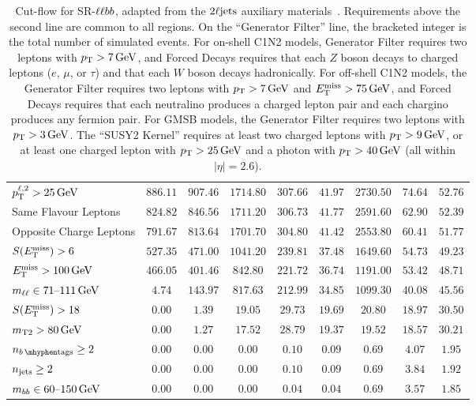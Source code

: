 \begin{sidewaystable}[tp]
{\begin{tabular}{lcccccccc}
$\pt^{\ell,2} > 25\,\eV[G]$                         & $886.11$ & $907.46$ & $1714.80$ & $307.66$ & $41.97$ & $2730.50$ & $74.64$ & $52.76$ \\
Same Flavour Leptons                                       & $824.82$ & $846.56$ & $1711.20$ & $306.73$ & $41.77$ & $2591.60$ & $62.90$ & $52.39$ \\
Opposite Charge Leptons                                   & $791.67$ & $813.64$ & $1701.70$ & $304.80$ & $41.42$ & $2553.80$ & $60.41$ & $51.77$ \\
$\metsig > 6$                                               & $527.35$ & $471.00$ & $1041.20$ & $239.81$ & $37.48$ & $1649.60$ & $54.73$ & $49.23$ \\
$\met > 100\,\eV[G]$                                           & $466.05$ & $401.46$ & $842.80$ & $221.72$ & $36.74$ & $1191.00$ & $53.42$ & $48.71$ \\
\hline
$\mll \in 71\textrm{--}111\,\eV[G]$                            & $4.74$ & $143.97$ & $817.63$ & $212.99$ & $34.85$ & $1099.30$ & $40.08$ & $45.56$ \\
$\metsig > 18$                                            & $0.00$ & $1.39$ & $19.05$ & $29.73$ & $19.69$ & $20.80$ & $18.97$ & $30.50$ \\
$\mttwo > 80\,\eV[G]$                                        & $0.00$ & $1.27$ & $17.52$ & $28.79$ & $19.37$ & $19.52$ & $18.57$ & $30.21$ \\
$\nbtag \geq 2$                                          & $0.00$ & $0.00$ & $0.00$ & $0.10$ & $0.09$ & $0.69$ & $4.07$ & $1.95$ \\
$\njet \geq 2$                               & $0.00$ & $0.00$ & $0.00$ & $0.10$ & $0.09$ & $0.69$ & $3.84$ & $1.92$ \\
$\mbb \in 60\text{--}150\,\eV[G]$                            & $0.00$ & $0.00$ & $0.00$ & $0.04$ & $0.04$ & $0.69$ & $3.57$ & $1.85$ \\
\end{tabular}
}
\caption[
Cut-flow for SR-$\llbb$
]{%
Cut-flow for SR-$\llbb$,
adapted from the $\twoljets$ auxiliary materials~\cite{hepdata.116034}.
Requirements above the second line are common to all regions.
On the ``Generator Filter'' line, the bracketed integer is the total number of
simulated events.
For on-shell C1N2 models, Generator Filter requires
two leptons with $\pt > 7\,\eV[G]$, and
Forced Decays requires
that each $Z$ boson decays to charged leptons ($e$, $\mu$, or $\tau$)
and that each $W$ boson decays hadronically.
For off-shell C1N2 models, the Generator Filter requires
two leptons with $\pt > 7\,\eV[G]$ and $\met > 75\,\eV[G]$, and
Forced Decays requires
that each neutralino produces a charged lepton pair and each chargino produces
any fermion pair.
For GMSB models, the Generator Filter requires
two leptons with $\pt > 3\,\eV[G]$.
The ``SUSY2 Kernel'' requires at least two charged leptons with
$\pt > 9\,\eV[G]$, or at least one charged lepton with
$\pt > 25\,\eV[G]$ and a photon with $\pt > 40\,\eV[G]$
(all within $|\eta|=2.6$).
}
\label{aux:ewk:cutflowSRllbb}
\end{sidewaystable}

